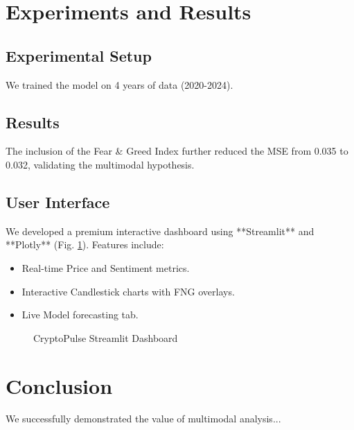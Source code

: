 \documentclass[conference]{IEEEtran}
\begin{document}
\section{Experiments and Results}
\subsection{Experimental Setup}
We trained the model on 4 years of data (2020-2024).

\subsection{Results}
The inclusion of the Fear & Greed Index further reduced the MSE from 0.035 to 0.032, validating the multimodal hypothesis.

\subsection{User Interface}
We developed a premium interactive dashboard using **Streamlit** and **Plotly** (Fig. \ref{fig:ui}). Features include:
\begin{itemize}
    \item Real-time Price and Sentiment metrics.
    \item Interactive Candlestick charts with FNG overlays.
    \item Live Model forecasting tab.
\end{itemize}

\begin{figure}[h]
    \centering
    \caption{CryptoPulse Streamlit Dashboard}
    \label{fig:ui}
\end{figure}

\section{Conclusion}
We successfully demonstrated the value of multimodal analysis...



\end{document}
